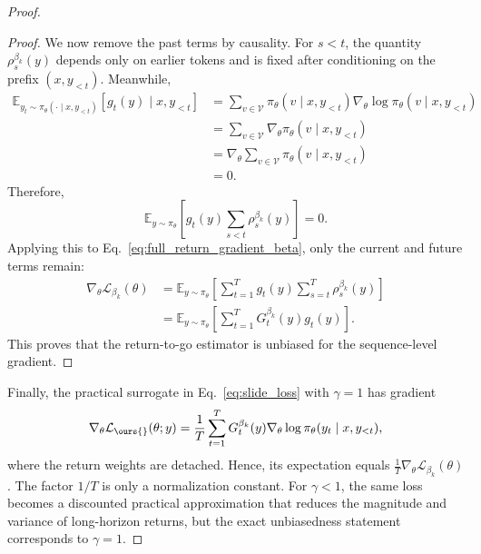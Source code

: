 \begin{proof}
\begin{proof}
We now remove the past terms by causality. For $s<t$, the quantity
$\rho_s^{\beta_k}(y)$ depends only on earlier tokens and is fixed after conditioning on the
prefix $(x,y_{<t})$. Meanwhile,
\begin{align}
    \mathbb{E}_{y_t\sim\pi_\theta(\cdot\mid x,y_{<t})}
    \left[
    g_t(y)
    \mid x,y_{<t}
    \right]
    &=
    \sum_{v\in\mathcal{V}}
    \pi_\theta(v\mid x,y_{<t})
    \nabla_\theta
    \log \pi_\theta(v\mid x,y_{<t}) \\
    &=
    \sum_{v\in\mathcal{V}}
    \nabla_\theta
    \pi_\theta(v\mid x,y_{<t}) \\
    &=
    \nabla_\theta
    \sum_{v\in\mathcal{V}}
    \pi_\theta(v\mid x,y_{<t}) \\
    &=
    0.
\end{align}
Therefore,
\begin{equation}
    \mathbb{E}_{y\sim\pi_\theta}
    \left[
    g_t(y)
    \sum_{s<t}
    \rho_s^{\beta_k}(y)
    \right]
    =
    0.
\end{equation}
Applying this to Eq.~\ref{eq:full_return_gradient_beta}, only the current and future terms
remain:
\begin{align}
    \nabla_\theta \mathcal{L}_{\beta_k}(\theta)
    &=
    \mathbb{E}_{y\sim\pi_\theta}
    \left[
    \sum_{t=1}^{T}
    g_t(y)
    \sum_{s=t}^{T}
    \rho_s^{\beta_k}(y)
    \right] \\
    &=
    \mathbb{E}_{y\sim\pi_\theta}
    \left[
    \sum_{t=1}^{T}
    G_t^{\beta_k}(y)
    g_t(y)
    \right].
\end{align}
This proves that the return-to-go estimator is unbiased for the sequence-level gradient.
\end{proof}

Finally, the practical surrogate in Eq.~\ref{eq:slide_loss} with $\gamma=1$ has gradient
\begin{equation}
    \nabla_\theta \mathcal{L}_{\ours{}}(\theta;y)
    =
    \frac{1}{T}
    \sum_{t=1}^{T}
    G_t^{\beta_k}(y)
    \nabla_\theta
    \log \pi_\theta(y_t\mid x,y_{<t}),
\end{equation}
where the return weights are detached. Hence, its expectation equals
$\frac{1}{T}\nabla_\theta \mathcal{L}_{\beta_k}(\theta)$. The factor $1/T$ is only a
normalization constant. For $\gamma<1$, the same loss becomes a discounted practical
approximation that reduces the magnitude and variance of long-horizon returns, but the
exact unbiasedness statement corresponds to $\gamma=1$.
\end{proof}


